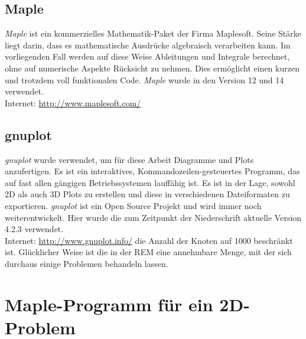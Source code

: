 \subsection{Maple\texttrademark}
\label{app:maple}
\emph{Maple\texttrademark} ist ein kommerzielles Mathematik-Paket der Firma Maplesoft. Seine Stärke liegt darin, dass es mathematische Ausdrücke algebraisch verarbeiten kann. Im vorliegenden Fall werden auf diese Weise Ableitungen und Integrale berechnet, ohne auf numerische Aspekte Rücksicht zu nehmen. Dies ermöglicht einen kurzen und trotzdem voll funktionalen Code. \emph{Maple\texttrademark} wurde in den Version 12 und 14 verwendet.\\
Internet: \url{http://www.maplesoft.com/}

\subsection{gnuplot}
\emph{gnuplot} wurde verwendet, um für diese Arbeit Diagramme und Plots anzufertigen. Es ist ein interaktives, Kommandozeilen-gesteuertes Programm, das auf fast allen gängigen Betriebssystemen lauffähig ist. Es ist in der Lage, sowohl 2D als auch 3D Plots zu erstellen und diese in verschiedenen Dateiformaten zu exportieren. \emph{gnuplot} ist ein Open Source Projekt und wird immer noch weiterentwickelt. Hier wurde die zum Zeitpunkt der Niederschrift aktuelle Version 4.2.3 verwendet.\\
Internet: \url{http://www.gnuplot.info/}
die Anzahl der Knoten auf 1000 beschränkt ist. Glücklicher Weise ist die in der REM eine annehmbare Menge, mit der sich durchaus einige Problemen behandeln lassen.

\clearpage

\section{Maple\texttrademark -Programm für ein 2D-Problem}
\label{sec:maplecode}

%
  

%
%  
%

